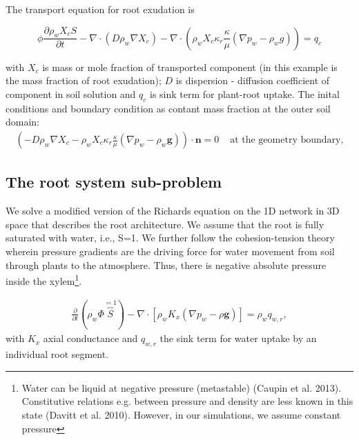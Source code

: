 The transport equation for root exudation is

\[
\phi\frac{\partial\rho_{w}X_{c}S}{\partial t}-\nabla \cdot (D\rho_{w}\nabla X_{c})-\nabla \cdot (\rho_{w}X_{c}\kappa_{r}\frac{\kappa}{\mu}(\nabla p_{w}-\rho_{w}g))=q_{c}
\]

with $X_{c}$ is mass or mole fraction of transported component (in
this example is the mass fraction of root exudation); $D$ is dispersion - diffusion
coefficient of component in soil solution and $q_{c}$ is sink term
for plant-root uptake. The inital conditions and boundary condition
as contant mass fraction at the outer soil domain:
\begin{eqnarray}
\left( -D\rho_{w}\nabla X_{c} - \rho_{w}X_{c}\kappa_{r}\frac{\kappa}{\mu}(\nabla p_{w}-\rho_{w}\mathbf{g})  \right) \cdot \mathbf{n}=0 & \text{ at the geometry boundary},
\end{eqnarray}


\subsection*{The root system sub-problem}

We solve a modified version of the Richards equation on the 1D network in 3D space that describes the root architecture. We assume that the root is fully saturated with water, i.e., S=1. We further follow the cohesion-tension theory wherein pressure gradients are the driving force for water movement from soil through plants to the atmosphere. Thus, there is negative absolute pressure inside the xylem\footnote{Water can be liquid at negative pressure (metastable) (Caupin et al. 2013). Constitutive relations e.g. between pressure and density are less known in this state (Davitt et al. 2010). However, in our simulations, we assume constant pressure}.

\begin{eqnarray}
\frac{\partial}{\partial t}\left(\rho_{w}\Phi\overbrace{S}^{=1}\right)-\nabla\cdot\left[\rho_{w}K_{x}\left(\nabla p_{w}-\rho\boldsymbol{g}\right)\right]=\rho_{w}q_{w,r},
\end{eqnarray}
with $K_{x}$ axial conductance and $q_{w,r}$ the sink term for water
uptake by an individual root segment.

